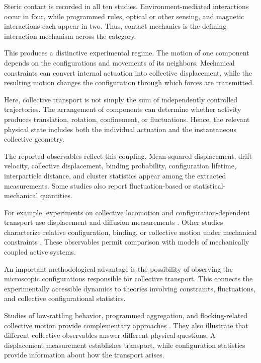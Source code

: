 Steric contact is recorded in all ten studies.
Environment-mediated interactions occur in four,
while programmed rules, optical or other sensing,
and magnetic interactions each appear in two.
Thus, contact mechanics is the defining interaction
mechanism across the category.

This produces a distinctive experimental regime.
The motion of one component depends on the
configurations and movements of its neighbors.
Mechanical constraints can convert internal
actuation into collective displacement, while
the resulting motion changes the configuration
through which forces are transmitted.

Here, collective transport is not simply the
sum of independently controlled trajectories.
The arrangement of components can determine
whether activity produces translation,
rotation, confinement, or fluctuations.
Hence, the relevant physical state includes
both the individual actuation and the
instantaneous collective geometry.

The reported observables reflect this coupling.
Mean-squared displacement, drift velocity,
collective displacement, binding probability,
configuration lifetime, interparticle distance,
and cluster statistics appear among the
extracted measurements. Some studies also
report fluctuation-based or
statistical-mechanical quantities.

For example, experiments on collective
locomotion and configuration-dependent
transport use displacement and diffusion
measurements
\cite{Li2018supersmarticlealo,Savoie2018phototacticsupersma,Warkentin2018locomotingrobotsco,Savoie2019arobotmadeofrobo}.
Other studies characterize relative
configuration, binding, or collective
motion under mechanical constraints
\cite{Bhamla2021collectivetransport,Vardhan2022glidersinshapecha,OzkanAydin2020collectiveprotectio}.
These observables permit comparison
with models of mechanically coupled
active systems.

An important methodological advantage
is the possibility of observing the
microscopic configurations responsible
for collective transport. This connects
the experimentally accessible dynamics
to theories involving constraints,
fluctuations, and collective
configurational statistics.

Studies of low-rattling behavior,
programmed aggregation, and
flocking-related collective motion
provide complementary approaches
\cite{Chvykov2020lowrattlingapred,Li2020programmingactiveg,Luo2025flockingphasesepar}.
They also illustrate that different
collective observables answer
different physical questions.
A displacement measurement establishes
transport, while configuration
statistics provide information
about how the transport arises.

